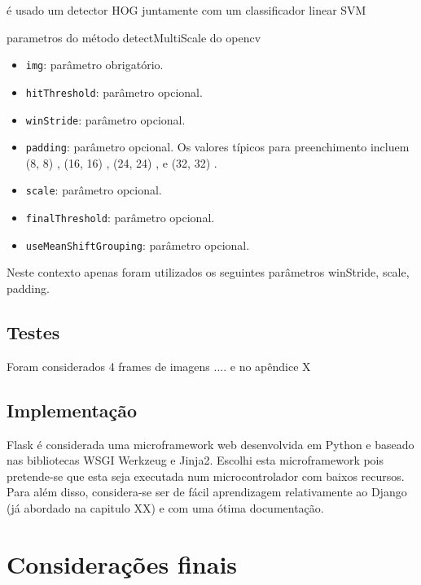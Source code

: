 é usado um detector HOG juntamente com um classificador linear SVM 





parametros do método detectMultiScale do opencv 

\begin{itemize}
	\item \texttt{img}: parâmetro obrigatório. 
	\item \texttt{hitThreshold}: parâmetro opcional. 
	\item \texttt{winStride}: parâmetro opcional. 
	\item \texttt{padding}: parâmetro opcional.  Os valores típicos para preenchimento incluem  (8, 8) ,  (16, 16) ,  (24, 24) , e  (32, 32) .
	
	
	\item \texttt{scale}: parâmetro opcional. 
	\item \texttt{finalThreshold}: parâmetro opcional. 
	\item \texttt{useMeanShiftGrouping}: parâmetro opcional. 
\end{itemize}





Neste contexto apenas foram utilizados os seguintes parâmetros winStride, scale, padding. 



\subsection{Testes}

Foram considerados 4 frames de imagens .... e no apêndice X




\subsection{Implementação}



Flask é considerada uma microframework web desenvolvida em Python e baseado nas bibliotecas WSGI Werkzeug e Jinja2. Escolhi esta microframework pois pretende-se que esta seja executada num microcontrolador com baixos recursos. Para além disso, considera-se ser de fácil aprendizagem relativamente ao Django (já abordado na capitulo XX) e com uma ótima documentação. 





\section{Considerações finais}





